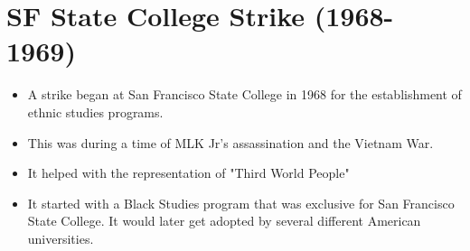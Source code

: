 \documentclass{article}
\begin{document}
\section{SF State College Strike (1968-1969)}
\begin{itemize}
  \item A strike began at San Francisco State College in 1968
    for the establishment of ethnic studies programs.
  \item This was during a time of MLK Jr's assassination and the Vietnam War.
  \item It helped with the representation of "Third World People"
  \item It started with a Black Studies program that
    was exclusive for San Francisco State College.
    It would later get adopted by several different American universities.
\end{itemize}
  
\end{document}
